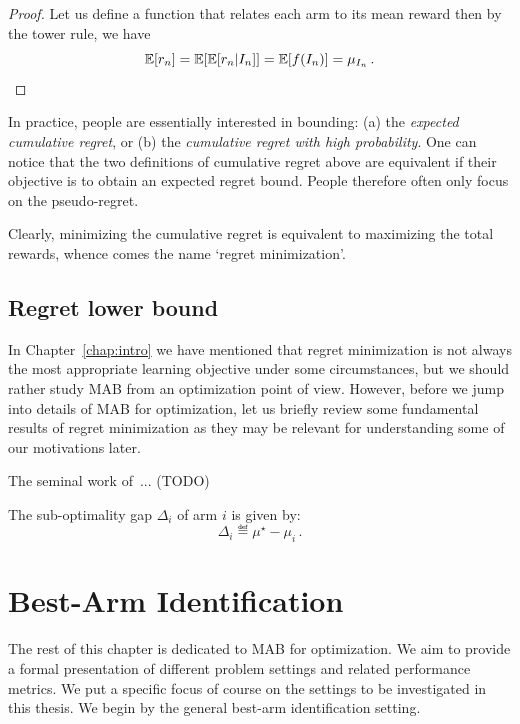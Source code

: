 \begin{proof}
	Let us define a function that relates each arm to its mean reward  then by the tower rule, we have
    \[
	    \mathbb{E}[r_n] = \mathbb{E}[\mathbb{E}[r_n|I_n]] = \mathbb{E}[f(I_n)] = \mu_{I_n}\,.
    \]
\end{proof}

In practice, people are essentially interested in bounding: (a) the \emph{expected cumulative regret}, or (b) the \emph{cumulative regret with high probability}. One can notice that the two definitions of cumulative regret above are equivalent if their objective is to obtain an expected regret bound. People therefore often only focus on the pseudo-regret.

Clearly, minimizing the cumulative regret is equivalent to maximizing the total rewards, whence comes the name `regret minimization'. 

\subsection{Regret lower bound}

In Chapter~\ref{chap:intro} we have mentioned that regret minimization is not always the most appropriate learning objective under some circumstances, but we should rather study MAB from an optimization point of view. However, before we jump into details of MAB for optimization, let us briefly review some fundamental results of regret minimization as they may be relevant for understanding some of our motivations later.

The seminal work of~\cite{robbins1952}... (TODO)

\begin{definition}\label{def:mab.gap}
\begin{leftbar}[defnbar]
The sub-optimality gap $\Delta_i$ of arm $i$ is given by:
\[
	\Delta_i \eqdef \mu^{\star} - \mu_i\,.
\]
\end{leftbar}
\end{definition}

\section{Best-Arm Identification}\label{sec:mab.bai}

The rest of this chapter is dedicated to MAB for optimization. We aim to provide a formal presentation of different problem settings and related performance metrics. We put a specific focus of course on the settings to be investigated in this thesis. We begin by the general best-arm identification setting.

